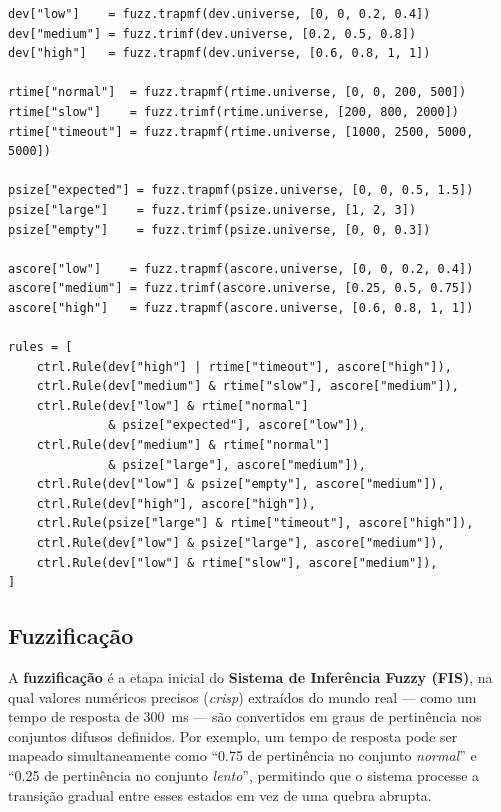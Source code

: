 \begin{lstlisting}[caption=Funções de pertinência e regras do FIS (\texttt{fuzzy\_engine.py}), label=lst:mfs]
dev["low"]    = fuzz.trapmf(dev.universe, [0, 0, 0.2, 0.4])
dev["medium"] = fuzz.trimf(dev.universe, [0.2, 0.5, 0.8])
dev["high"]   = fuzz.trapmf(dev.universe, [0.6, 0.8, 1, 1])

rtime["normal"]  = fuzz.trapmf(rtime.universe, [0, 0, 200, 500])
rtime["slow"]    = fuzz.trimf(rtime.universe, [200, 800, 2000])
rtime["timeout"] = fuzz.trapmf(rtime.universe, [1000, 2500, 5000, 5000])

psize["expected"] = fuzz.trapmf(psize.universe, [0, 0, 0.5, 1.5])
psize["large"]    = fuzz.trimf(psize.universe, [1, 2, 3])
psize["empty"]    = fuzz.trimf(psize.universe, [0, 0, 0.3])

ascore["low"]    = fuzz.trapmf(ascore.universe, [0, 0, 0.2, 0.4])
ascore["medium"] = fuzz.trimf(ascore.universe, [0.25, 0.5, 0.75])
ascore["high"]   = fuzz.trapmf(ascore.universe, [0.6, 0.8, 1, 1])

rules = [
    ctrl.Rule(dev["high"] | rtime["timeout"], ascore["high"]),
    ctrl.Rule(dev["medium"] & rtime["slow"], ascore["medium"]),
    ctrl.Rule(dev["low"] & rtime["normal"]
              & psize["expected"], ascore["low"]),
    ctrl.Rule(dev["medium"] & rtime["normal"]
              & psize["large"], ascore["medium"]),
    ctrl.Rule(dev["low"] & psize["empty"], ascore["medium"]),
    ctrl.Rule(dev["high"], ascore["high"]),
    ctrl.Rule(psize["large"] & rtime["timeout"], ascore["high"]),
    ctrl.Rule(dev["low"] & psize["large"], ascore["medium"]),
    ctrl.Rule(dev["low"] & rtime["slow"], ascore["medium"]),
]
\end{lstlisting}

\subsection{Fuzzificação}

A \textbf{fuzzificação} é a etapa inicial do \textbf{Sistema de Inferência Fuzzy (FIS)}, na qual valores numéricos precisos (\textit{crisp}) extraídos do mundo real --- como um tempo de resposta de 300~ms --- são convertidos em graus de pertinência nos conjuntos difusos definidos. Por exemplo, um tempo de resposta pode ser mapeado simultaneamente como ``0.75 de pertinência no conjunto \textit{normal}'' e ``0.25 de pertinência no conjunto \textit{lento}'', permitindo que o sistema processe a transição gradual entre esses estados em vez de uma quebra abrupta.

